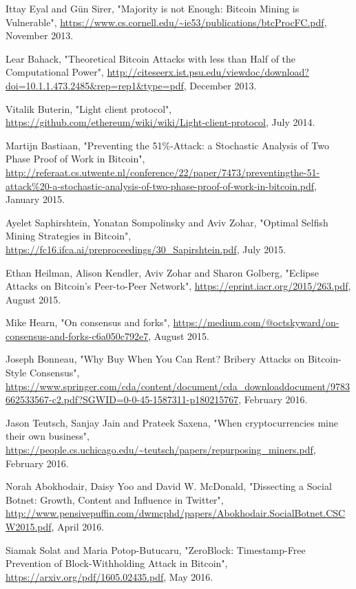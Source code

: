 \documentclass[12pt,a4paper]{article}
\begin{document}
\begin{thebibliography}{9}
Ittay Eyal and Gün Sirer,
"Majority is not Enough: Bitcoin Mining is Vulnerable",
\url{https://www.cs.cornell.edu/~ie53/publications/btcProcFC.pdf},
November 2013.

Lear Bahack,
"Theoretical Bitcoin Attacks with less than Half of the Computational Power",
\url{http://citeseerx.ist.psu.edu/viewdoc/download?doi=10.1.1.473.2485&rep=rep1&type=pdf},
December 2013.

Vitalik Buterin,
"Light client protocol",
\url{https://github.com/ethereum/wiki/wiki/Light-client-protocol},
July 2014.

Martijn Bastiaan,
"Preventing the 51\%-Attack: a Stochastic Analysis of Two Phase Proof of Work in Bitcoin",
\url{http://referaat.cs.utwente.nl/conference/22/paper/7473/preventingthe-51-attack%20-a-stochastic-analysis-of-two-phase-proof-of-work-in-bitcoin.pdf},
January 2015.

Ayelet Saphirshtein, Yonatan Sompolinsky and Aviv Zohar,
"Optimal Selfish Mining Strategies in Bitcoin",
\url{https://fc16.ifca.ai/preproceedings/30_Sapirshtein.pdf},
July 2015.

Ethan Heilman, Alison Kendler, Aviv Zohar and Sharon Golberg,
"Eclipse Attacks on Bitcoin’s Peer-to-Peer Network",
\url{https://eprint.iacr.org/2015/263.pdf},
August 2015.

Mike Hearn,
"On consensus and forks",
\url{https://medium.com/@octskyward/on-consensus-and-forks-c6a050c792e7},
August 2015.

Joseph Bonneau,
"Why Buy When You Can Rent? Bribery Attacks on Bitcoin-Style Consensus",
\url{https://www.springer.com/cda/content/document/cda_downloaddocument/9783662533567-c2.pdf?SGWID=0-0-45-1587311-p180215767},
February 2016.

Jason Teutsch, Sanjay Jain and Prateek Saxena,
"When cryptocurrencies mine their own business",
\url{https://people.cs.uchicago.edu/~teutsch/papers/repurposing_miners.pdf},
February 2016.

Norah Abokhodair, Daisy Yoo and David W. McDonald,
"Dissecting a Social Botnet: Growth, Content and Influence in Twitter",
\url{http://www.pensivepuffin.com/dwmcphd/papers/Abokhodair.SocialBotnet.CSCW2015.pdf},
April 2016.

Siamak Solat and Maria Potop-Butucaru,
"ZeroBlock: Timestamp-Free Prevention of Block-Withholding Attack in Bitcoin",
\url{https://arxiv.org/pdf/1605.02435.pdf},
May 2016.


\end{thebibliography}
\end{document}
